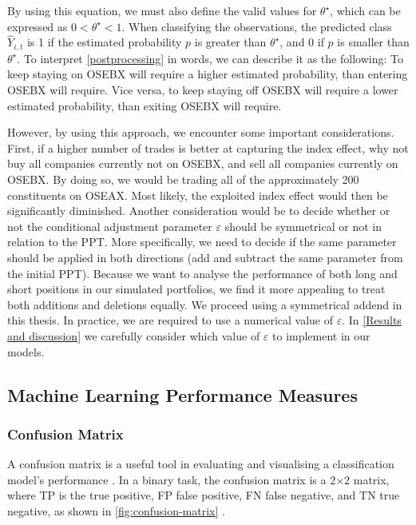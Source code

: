By using this equation, we must also define the valid values for $\theta^\star$, which can be expressed as $0 < \theta^\star < 1$. When classifying the observations, the predicted class $\widehat Y_{i,t}$ is 1 if the estimated probability $p$ is greater than $\theta^\star$, and 0 if $p$ is smaller than $\theta^\star$. To interpret \autoref{postprocessing} in words, we can describe it as the following: To keep staying on OSEBX will require a higher estimated probability, than entering OSEBX will require. Vice versa, to keep staying off OSEBX will require a lower estimated probability, than exiting OSEBX will require. 

However, by using this approach, we encounter some important considerations. First, if a higher number of trades is better at capturing the index effect, why not buy all companies currently not on OSEBX, and sell all companies currently on OSEBX. By doing so, we would be trading all of the approximately 200 constituents on OSEAX. Most likely, the exploited index effect would then be significantly diminished. Another consideration would be to decide whether or not the conditional adjustment parameter $\varepsilon$ should be symmetrical or not in relation to the PPT. More specifically, we need to decide if the same parameter should be applied in both directions (add and subtract the same parameter from the initial PPT). Because we want to analyse the performance of both long and short positions in our simulated portfolios, we find it more appealing to treat both additions and deletions equally. We proceed using a symmetrical addend in this thesis. In practice, we are required to use a numerical value of $\varepsilon$. In \autoref{Results and discussion} we carefully consider which value of $\varepsilon$ to implement in our models.

\subsection{Machine Learning Performance Measures}

\subsubsection{Confusion Matrix}

A confusion matrix is a useful tool in evaluating and visualising a classification model's performance \parencite{caelan-a-bayesian-interpretation-of-the-confusion-matrix}. In a binary task, the confusion matrix is a 2$\times$2 matrix, where TP is the true positive, FP false positive, FN false negative, and TN true negative, as shown in \autoref{fig:confusion-matrix} \parencite{caelan-a-bayesian-interpretation-of-the-confusion-matrix}. 

